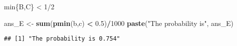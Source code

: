 \documentclass[
]{article}
\newenvironment{Shaded}{\begin{snugshade}}{\end{snugshade}}
\newcommand{\DecValTok}[1]{\textcolor[rgb]{0.00,0.00,0.81}{#1}}
\newcommand{\FloatTok}[1]{\textcolor[rgb]{0.00,0.00,0.81}{#1}}
\newcommand{\KeywordTok}[1]{\textcolor[rgb]{0.13,0.29,0.53}{\textbf{#1}}}
\newcommand{\NormalTok}[1]{#1}
\newcommand{\OperatorTok}[1]{\textcolor[rgb]{0.81,0.36,0.00}{\textbf{#1}}}
\newcommand{\StringTok}[1]{\textcolor[rgb]{0.31,0.60,0.02}{#1}}
\begin{document}
min\{B,C\} \textless{} 1/2

\begin{Shaded}
\begin{Highlighting}[]
\NormalTok{ans_E <-}\StringTok{ }\KeywordTok{sum}\NormalTok{(}\KeywordTok{pmin}\NormalTok{(b,c) }\OperatorTok{<}\StringTok{ }\FloatTok{0.5}\NormalTok{)}\OperatorTok{/}\DecValTok{1000}
\KeywordTok{paste}\NormalTok{(}\StringTok{"The probability is"}\NormalTok{, ans_E)}
\end{Highlighting}
\end{Shaded}

\begin{verbatim}
## [1] "The probability is 0.754"
\end{verbatim}
\end{document}
